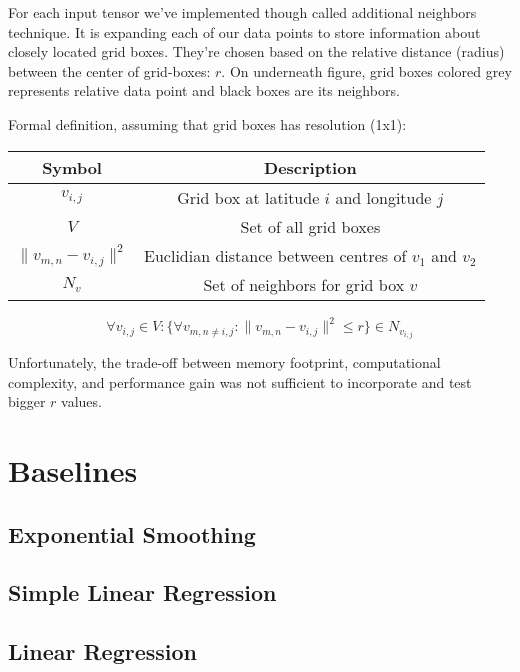 \noindent For each input tensor we've implemented though called additional neighbors technique. It is expanding each of our data points to store information about closely located grid boxes. They're chosen based on the relative distance (radius) between the center of grid-boxes: $r$. On underneath figure, grid boxes colored grey represents relative data point and black boxes are its neighbors.



\noindent Formal definition, assuming that grid boxes has resolution (1x1):
\begin{table}[!h]
    \centering
    \begin{tabular}{|c|c|}
        \hline
        Symbol & Description \\
        \hline
        $v_{i,j}$ & Grid box at latitude $i$ and longitude $j$ \\
        $V$  & Set of all grid boxes \\
        $\|v_{m,n} - v_{i,j}\|^2$  & Euclidian distance between centres of $v_1$ and $v_2$ \\
        $N_v$ & Set of neighbors for grid box $v$ \\
        \hline
    \end{tabular}
\end{table}
\[
    \forall v_{i,j} \in V: \{\forall v_{m,n \neq i,j} : \|v_{m,n} - v_{i,j}\|^2 \le r\} \in N_{v_{i,j}}
\]

\noindent Unfortunately, the trade-off between memory footprint, computational complexity, and performance gain was not sufficient to incorporate and test bigger $r$ values.

 
 \section{Baselines}
 \subsection{Exponential Smoothing}
 \subsection{Simple Linear Regression}
 \subsection{Linear Regression}
 
